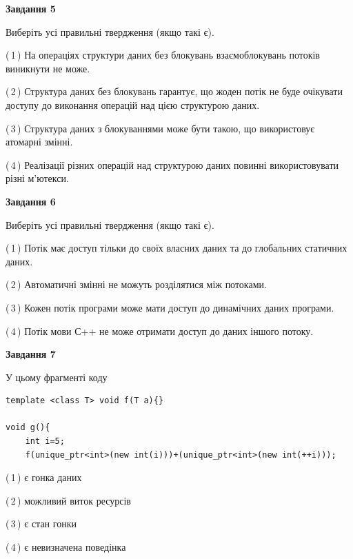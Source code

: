 \documentclass[12pt, ukrainian]{article}
\begin{document}
\begin {large}
{\begin{center}
\textbf{Завдання 5}
\end{center}

Виберіть усі правильні твердження (якщо такі є).\par
\vspace{2mm}

(\,1\,) На операціях структури даних без блокувань взаємоблокувань потоків виникнути не може.%

(\,2\,) Структура даних без блокувань гарантує, що жоден потік не буде очікувати доступу до виконання операцій над цією структурою даних.%

(\,3\,) Структура даних з блокуваннями може бути такою, що використовує атомарні змінні.%

(\,4\,) Реалізації різних операцій над структурою даних повинні використовувати різні м’ютекси.%
\newpage


\begin{center}
\textbf{Завдання 6}
\end{center}

Виберіть усі правильні твердження (якщо такі є).\par
\vspace{2mm}

(\,1\,) Потік має доступ тільки до своїх власних даних та до глобальних статичних даних.%

(\,2\,) Автоматичні змінні не можуть розділятися між потоками.%

(\,3\,) Кожен потік програми може мати доступ до динамічних даних програми.%

(\,4\,) Потік мови С++ не може отримати доступ до даних іншого потоку.%


\begin{center}
\textbf{Завдання 7}
\end{center}

У цьому фрагменті коду
\begin{verbatim}
template <class T> void f(T a){}

void g(){
    int i=5;
    f(unique_ptr<int>(new int(i)))+(unique_ptr<int>(new int(++i)));
\end{verbatim}
(\,1\,) є гонка даних%

(\,2\,) можливий виток ресурсів%

(\,3\,) є стан гонки%

(\,4\,) є невизначена поведінка%

}
\end {large}

\vspace{4mm}
\newpage
\end{document}
